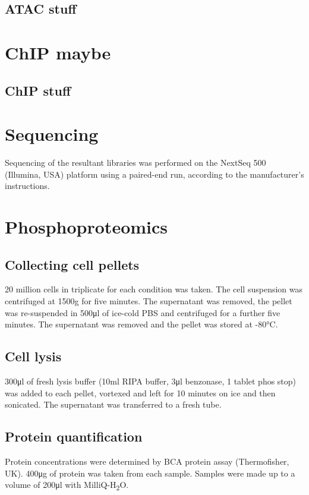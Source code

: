 \subsection{ATAC stuff}

\section{ChIP maybe}
\subsection{ChIP stuff}

\section{Sequencing}
Sequencing of the resultant libraries was performed on the NextSeq 500 (Illumina, USA) platform using a paired-end run, according to the manufacturer's instructions.

%
\section{Phosphoproteomics}\label{sec:methods-phospho}
%
\subsection{Collecting cell pellets}
20 million cells in triplicate for each condition was taken.
The cell suspension was centrifuged at 1500g for five minutes.
The supernatant was removed, the pellet was re-suspended in 500\si{\ul} of ice-cold PBS and centrifuged for a further five minutes.
The supernatant was removed and the pellet was stored at -80\si{\degreeCelsius}.

\subsection{Cell lysis}
300\si{\ul} of fresh lysis buffer (10\si{\ml} RIPA buffer, 3\si{\ul} benzonase, 1 tablet phos stop) was added to each pellet, vortexed and left for 10 minutes on ice and then sonicated.
The supernatant was transferred to a fresh tube.

\subsection{Protein quantification}
Protein concentrations were determined by BCA protein assay (Thermofisher, UK). 400\si{\ug} of protein was taken from each sample. Samples were made up to a volume of 200\si{\ul} with MilliQ-H\textsubscript{2}O.

